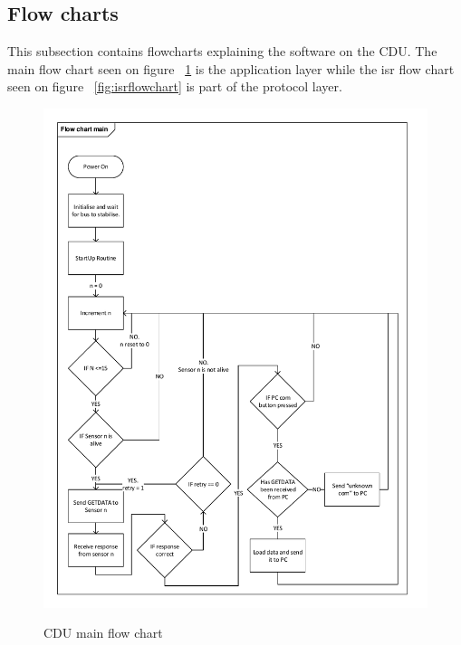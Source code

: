 \subsection{Flow charts}
This subsection contains flowcharts explaining the software on the CDU. The main flow chart seen on figure ~\ref{fig:mainflowchart} is the application layer while the isr flow chart seen on figure ~\ref{fig:isrflowchart} is part of the protocol layer. 
\begin{figure}[H]
\centering
\includegraphics[width=1\textwidth]{billeder/mainflowchart}
\label{fig:mainflowchart}
\caption{CDU main flow chart}
\end{figure}

